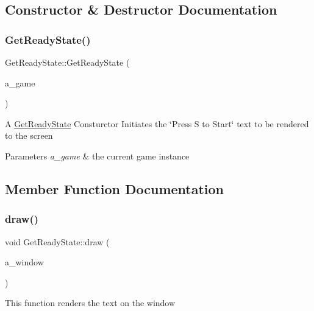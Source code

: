 \subsection{Constructor \& Destructor Documentation}
\mbox{\label{class_get_ready_state_a227e45622dad03369a88024b54df0e92}} 
\subsubsection{\texorpdfstring{Get\+Ready\+State()}{GetReadyState()}}
{\footnotesize\ttfamily Get\+Ready\+State\+::\+Get\+Ready\+State (\begin{DoxyParamCaption}\item[{\hyperlink{class_game}{Game} $\ast$}]{a\+\_\+game }\end{DoxyParamCaption})}

A \hyperlink{class_get_ready_state}{Get\+Ready\+State} Consturctor Initiates the \char`\"{}\+Press S to Start\char`\"{} text to be rendered to the screen 
\begin{DoxyParams}{Parameters}
{\em a\+\_\+game} & the current game instance \\
\hline
\end{DoxyParams}


\subsection{Member Function Documentation}
\mbox{\label{class_get_ready_state_a5526ece0f8f8becab78b78fbc7919045}} 
\subsubsection{\texorpdfstring{draw()}{draw()}}
{\footnotesize\ttfamily void Get\+Ready\+State\+::draw (\begin{DoxyParamCaption}\item[{sf\+::\+Render\+Window \&}]{a\+\_\+window }\end{DoxyParamCaption})\hspace{0.3cm}{\ttfamily [virtual]}}

This function renders the text on the window


